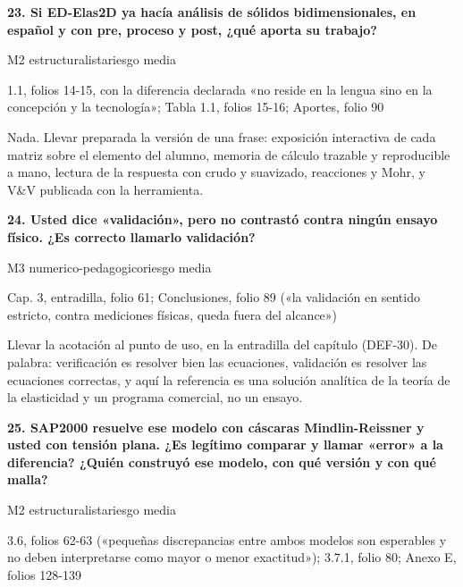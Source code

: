 \vspace{5pt}
\noindent\casilla\textbf{23. Si ED-Elas2D ya hacía análisis de sólidos bidimensionales, en español y con pre, proceso y post, ¿qué aporta su trabajo?}\par
{\small\color{gris}\sffamily M2 estructuralista\quad{}\quad riesgo media}\par
{\small{}1.1, folios 14-15, con la diferencia declarada «no reside en la lengua sino en la concepción y la tecnología»; Tabla 1.1, folios 15-16; Aportes, folio 90\par}
{\small{}Nada. Llevar preparada la versión de una frase: exposición interactiva de cada matriz sobre el elemento del alumno, memoria de cálculo trazable y reproducible a mano, lectura de la respuesta con crudo y suavizado, reacciones y Mohr, y V\&V publicada con la herramienta.\par}
\vspace{5pt}
\noindent\casilla\textbf{24. Usted dice «validación», pero no contrastó contra ningún ensayo físico. ¿Es correcto llamarlo validación?}\par
{\small\color{gris}\sffamily M3 numerico-pedagogico\quad{}\quad riesgo media}\par
{\small{}Cap. 3, entradilla, folio 61; Conclusiones, folio 89 («la validación en sentido estricto, contra mediciones físicas, queda fuera del alcance»)\par}
{\small{}Llevar la acotación al punto de uso, en la entradilla del capítulo (DEF-30). De palabra: verificación es resolver bien las ecuaciones, validación es resolver las ecuaciones correctas, y aquí la referencia es una solución analítica de la teoría de la elasticidad y un programa comercial, no un ensayo.\par}
\vspace{5pt}
\noindent\casilla\textbf{25. SAP2000 resuelve ese modelo con cáscaras Mindlin-Reissner y usted con tensión plana. ¿Es legítimo comparar y llamar «error» a la diferencia? ¿Quién construyó ese modelo, con qué versión y con qué malla?}\par
{\small\color{gris}\sffamily M2 estructuralista\quad{}\quad riesgo media}\par
{\small{}3.6, folios 62-63 («pequeñas discrepancias entre ambos modelos son esperables y no deben interpretarse como mayor o menor exactitud»); 3.7.1, folio 80; Anexo E, folios 128-139\par}
